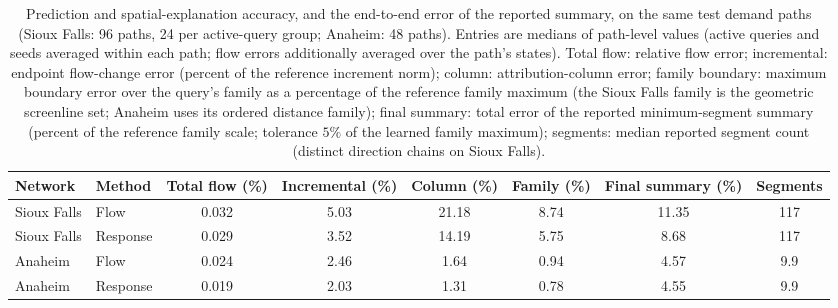 \begin{table}[t]\centering\footnotesize
\caption{Prediction and spatial-explanation accuracy, and the end-to-end
error of the reported summary, on the same test demand paths (Sioux
Falls: 96 paths, 24 per active-query group; Anaheim: 48 paths). Entries
are medians of path-level values (active queries and seeds averaged
within each path; flow errors additionally averaged over the path's
states). Total flow: relative flow error; incremental: endpoint
flow-change error (percent of the reference increment norm); column:
attribution-column error; family boundary: maximum boundary error over
the query's family as a percentage of the reference family maximum (the
Sioux Falls family is the geometric screenline set; Anaheim uses its
ordered distance family); final summary: total error of the reported
minimum-segment summary (percent of the reference family scale;
tolerance $5\%$ of the learned family maximum); segments: median
reported segment count (distinct direction chains on Sioux
Falls).}\label{tab:pathtable}
\setlength{\tabcolsep}{4.5pt}
\begin{tabular*}{\tblwidth}{@{\extracolsep{\fill}}llcccccc}
\toprule
Network & Method & Total flow (\%) & Incremental (\%) & Column (\%) & Family (\%) & Final summary (\%) & Segments\\
\midrule
Sioux Falls & Flow & 0.032 & 5.03 & 21.18 & 8.74 & 11.35 & 117\\
Sioux Falls & Response & 0.029 & 3.52 & 14.19 & 5.75 & 8.68 & 117\\
\addlinespace
Anaheim & Flow & 0.024 & 2.46 & 1.64 & 0.94 & 4.57 & 9.9\\
Anaheim & Response & 0.019 & 2.03 & 1.31 & 0.78 & 4.55 & 9.9\\
\bottomrule\end{tabular*}\end{table}

